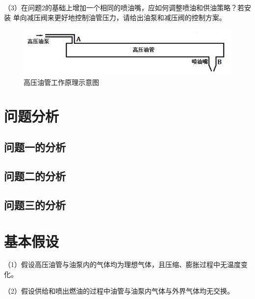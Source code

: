 \documentclass[withoutpreface,bwprint]{cumcmthesis} %
\begin{document}
（3）在问题2的基础上增加一个相同的喷油嘴，应如何调整喷油和供油策略？若安装
    单向减压阀来更好地控制油管压力，请给出油泵和减压阀的控制方案。

\begin{figure}[!h]
    \centering
    \includegraphics[width=.6\textwidth]{figure1.png}
    \caption{高压油管工作原理示意图}
    \label{figure1}
\end{figure}

\section{问题分析}
\subsection{问题一的分析}   


\subsection{问题二的分析}
        

\subsection{问题三的分析}
        
     

\section{基本假设}
（1）假设高压油管与油泵内的气体均为理想气体，且压缩、膨胀过程中无温度变化。

（2）假设供给和喷出燃油的过程中油管与油泵内气体与外界气体均无交换。    
\end{document}
